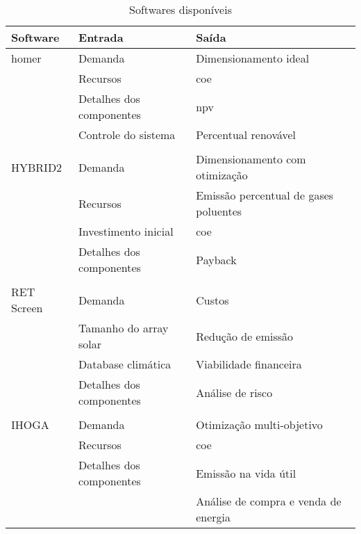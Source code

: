 
\begin{table}[ht]
	\centering
	\caption{Softwares disponíveis}\label{tbl:soft}
	\begin{tabular}{lll}
		\hline
        Software & Entrada & Saída \\
		\hline
		\hline
		\acrshort{homer} &   Demanda                     & Dimensionamento ideal                   \\
		                 &   Recursos                    & \acrshort{coe}                          \\
		                 &   Detalhes dos componentes    & \acrshort{npv}                          \\
                         &   Controle do sistema         & Percentual renovável                    \\
                         &                               &                                         \\
        HYBRID2          &   Demanda                     &  Dimensionamento com otimização         \\
		                 &   Recursos                    &  Emissão percentual de gases poluentes  \\
		                 &   Investimento inicial        &  \acrshort{coe}                         \\
						 &   Detalhes dos componentes    &  Payback                                \\
                         &                               &                                         \\
        RET Screen       &   Demanda                     &  Custos                                 \\
		                 &   Tamanho do array solar      &  Redução de emissão                     \\
		                 &   Database climática          &  Viabilidade financeira                 \\
		                 &   Detalhes dos componentes    &  Análise de risco                       \\
                         &                               &                                         \\
        IHOGA            &   Demanda                     &  Otimização multi-objetivo              \\
						 &   Recursos                    &  \acrshort{coe}                         \\
		                 &   Detalhes dos componentes    &  Emissão na vida útil                   \\
                         &                               &  Análise de compra e venda de energia   \\
		\hline
	\end{tabular}
\end{table}

